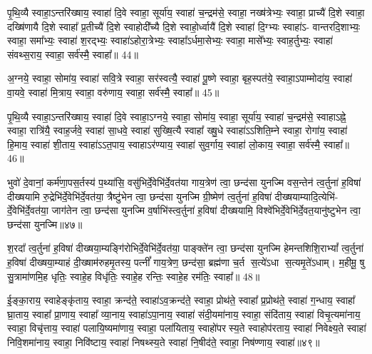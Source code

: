 {\anuvakamend[{}]}

पृ॒थि॒व्यै स्वाहा॒\-ऽन्तरि॑ख्षाय॒ स्वाहा॑ दि॒वे स्वाहा॒ सूर्या॑य॒ स्वाहा॑ च॒न्द्रम॑से॒ स्वाहा॒ नख्ष॑त्रेभ्यः॒ स्वाहा॒ प्राच्यै॑ दि॒शे स्वाहा॒ दख्षि॑णायै दि॒शे स्वाहा᳚ प्र॒तीच्यै॑ दि॒शे स्वाहोदी᳚च्यै दि॒शे स्वाहो॒र्ध्वायै॑ दि॒शे स्वाहा॑ दि॒ग्भ्यः स्वाहा॑\-ऽ- वान्तरदि॒शाभ्यः॒ स्वाहा॒ समा᳚भ्यः॒ स्वाहा॑ श॒रद्भ्यः॒ स्वाहा॑\-ऽहोरा॒त्रेभ्यः॒ स्वाहा᳚\-ऽर्धमा॒सेभ्यः॒ स्वाहा॒ मासे᳚भ्यः॒ स्वाह॒र्तुभ्यः॒ स्वाहा॑ संवथ्स॒राय॒ स्वाहा॒ सर्व॑स्मै॒ स्वाहा᳚॥ 44॥

{\anuvakamend[{}]}

अ॒ग्नये॒ स्वाहा॒ सोमा॑य॒ स्वाहा॑ सवि॒त्रे स्वाहा॒ सर॑स्वत्यै॒ स्वाहा॑ पू॒ष्णे स्वाहा॒ बृह॒स्पत॑ये॒ स्वाहा॒\-ऽपाम्मोदा॑य॒ स्वाहा॑ वा॒यवे॒ स्वाहा॑ मि॒त्राय॒ स्वाहा॒ वरु॑णाय॒ स्वाहा॒ सर्व॑स्मै॒ स्वाहा᳚॥ 45॥

{\anuvakamend[{}]}

पृ॒थि॒व्यै स्वाहा॒\-ऽन्तरि॑ख्षाय॒ स्वाहा॑ दि॒वे स्वाहा॒\-ऽग्नये॒ स्वाहा॒ सोमा॑य॒ स्वाहा॒ सूर्या॑य॒ स्वाहा॑ च॒न्द्रम॑से॒ स्वाहा\-ऽह्ने॒ स्वाहा॒ रात्रि॑यै॒ स्वाह॒र्जवे॒ स्वाहा॑ सा॒धवे॒ स्वाहा॑ सुख्षि॒त्यै स्वाहा᳚ ख्षु॒धे स्वाहा॑\-ऽ\-ऽशिति॒म्ने स्वाहा॒ रोगा॑य॒ स्वाहा॑ हि॒माय॒ स्वाहा॑ शी॒ताय॒ स्वाहा॑\-ऽ\-ऽत॒पाय॒ स्वाहा\-ऽर॑ण्याय॒ स्वाहा॑ सुव॒र्गाय॒ स्वाहा॑ लो॒काय॒ स्वाहा॒ सर्व॑स्मै॒ स्वाहा᳚॥ 46॥

{\anuvakamend[{}]}

भुवो॑ दे॒वानां॒ कर्म॑णा॒पस॒र्तस्य॑ प॒थ्या॑सि॒ वसु॑भिर्दे॒वेभि॑र्दे॒वत॑या गाय॒त्रेण॑ त्वा॒ छन्द॑सा युनज्मि वस॒न्तेन॑ त्व॒र्तुना॑ ह॒विषा॑ दीख्षयामि रु॒द्रेभि॑र्दे॒वेभि॑र्दे॒वत॑या॒ त्रैष्टु॑भेन त्वा॒ छन्द॑सा युनज्मि ग्री॒ष्मेण॑ त्व॒र्तुना॑ ह॒विषा॑ दीख्षयाम्यादि॒त्येभि॑- र्दे॒वेभि॑र्दे॒वत॑या॒ जाग॑तेन त्वा॒ छन्द॑सा युनज्मि व॒र्\mbox{}षाभि॑स्त्व॒र्तुना॑ ह॒विषा॑ दीख्षयामि॒ विश्वे॑भिर्दे॒वेभि॑र्दे॒वत॒यानु॑ष्टुभेन त्वा॒ छन्द॑सा युनज्मि॥४७॥

श॒रदा᳚ त्व॒र्तुना॑ ह॒विषा॑ दीख्षया॒म्यङ्गि॑रोभिर्दे॒वेभि॑र्दे॒वत॑या॒ पाङ्क्ते॑न त्वा॒ छन्द॑सा युनज्मि हेमन्तशिशि॒रा\-भ्यां᳚ त्व॒र्तुना॑ ह॒विषा॑ दीख्षया॒म्याहं दी॒ख्षाम॑रुहमृ॒तस्य॒ पत्नीं᳚ गाय॒त्रेण॒ छन्द॑सा॒ ब्रह्म॑णा च॒र्त स॒त्ये॑\-ऽधा स॒त्यमृ॒ते॑\-ऽधाम्। म॒हीमू॒ षु सु॒त्रामा॑णमि॒ह धृतिः॒ स्वाहे॒ह विधृ॑तिः॒ स्वाहे॒ह रन्तिः॒ स्वाहे॒ह रम॑तिः॒ स्वाहा᳚॥ 48॥

{\anuvakamend[{}]}

ई॒ङ्का॒राय॒ स्वाहेङ्कृ॑ताय॒ स्वाहा॒ क्रन्द॑ते॒ स्वाहा॑\-ऽव॒क्रन्द॑ते॒ स्वाहा॒ प्रोथ॑ते॒ स्वाहा᳚ प्र॒प्रोथ॑ते॒ स्वाहा॑ ग॒न्धाय॒ स्वाहा᳚ घ्रा॒ताय॒ स्वाहा᳚ प्रा॒णाय॒ स्वाहा᳚ व्या॒नाय॒ स्वाहा॑\-ऽपा॒नाय॒ स्वाहा॑ संदी॒यमा॑नाय॒ स्वाहा॒ संदि॑ताय॒ स्वाहा॑ विचृ॒त्यमा॑नाय॒ स्वाहा॒ विचृ॑त्ताय॒ स्वाहा॑ पलायि॒ष्यमा॑णाय॒ स्वाहा॒ पला॑यिताय॒ स्वाहो॑परस्य॒ते स्वाहोप॑रताय॒ स्वाहा॑ निवेक्ष्य॒ते स्वाहा॑ निवि॒शमा॑नाय॒ स्वाहा॒ निवि॑ष्टाय॒ स्वाहा॑ निषथ्स्य॒ते स्वाहा॑ नि॒षीद॑ते॒ स्वाहा॒ निष॑ण्णाय॒ स्वाहा॑॥४९॥

